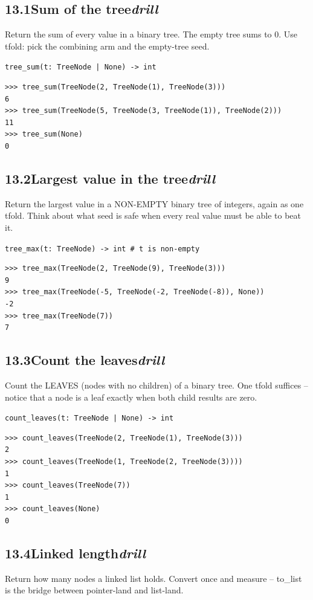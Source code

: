\documentclass[10pt,letterpaper]{book}
\begin{document}
\subsection*{13.1\quad Sum of the tree\hfill\textnormal{\textit{drill}}}
Return the sum of every value in a binary tree. The empty tree sums to 0. Use tfold: pick the combining arm and the empty-tree seed.

\noindent\texttt{tree\_sum(t: TreeNode | None) -> int}
\begin{lstlisting}[style=ex]
>>> tree_sum(TreeNode(2, TreeNode(1), TreeNode(3)))
6
>>> tree_sum(TreeNode(5, TreeNode(3, TreeNode(1)), TreeNode(2)))
11
>>> tree_sum(None)
0
\end{lstlisting}
\subsection*{13.2\quad Largest value in the tree\hfill\textnormal{\textit{drill}}}
Return the largest value in a NON-EMPTY binary tree of integers, again as one tfold. Think about what seed is safe when every real value must be able to beat it.

\noindent\texttt{tree\_max(t: TreeNode) -> int   \# t is non-empty}
\begin{lstlisting}[style=ex]
>>> tree_max(TreeNode(2, TreeNode(9), TreeNode(3)))
9
>>> tree_max(TreeNode(-5, TreeNode(-2, TreeNode(-8)), None))
-2
>>> tree_max(TreeNode(7))
7
\end{lstlisting}
\subsection*{13.3\quad Count the leaves\hfill\textnormal{\textit{drill}}}
Count the LEAVES (nodes with no children) of a binary tree. One tfold suffices -- notice that a node is a leaf exactly when both child results are zero.

\noindent\texttt{count\_leaves(t: TreeNode | None) -> int}
\begin{lstlisting}[style=ex]
>>> count_leaves(TreeNode(2, TreeNode(1), TreeNode(3)))
2
>>> count_leaves(TreeNode(1, TreeNode(2, TreeNode(3))))
1
>>> count_leaves(TreeNode(7))
1
>>> count_leaves(None)
0
\end{lstlisting}
\subsection*{13.4\quad Linked length\hfill\textnormal{\textit{drill}}}
Return how many nodes a linked list holds. Convert once and measure -- to\_list is the bridge between pointer-land and list-land.
\end{document}
